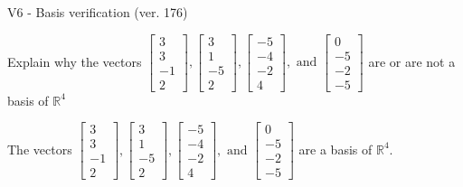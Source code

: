\begin{exercise}
  \begin{exerciseTitle}V6 - Basis verification (ver. 176)\end{exerciseTitle}
  \begin{exerciseStatement}
    Explain why the vectors \(\left[\begin{array}{r}
3 \\
3 \\
-1 \\
2
\end{array}\right] , \left[\begin{array}{r}
3 \\
1 \\
-5 \\
2
\end{array}\right] , \left[\begin{array}{r}
-5 \\
-4 \\
-2 \\
4
\end{array}\right] , \text{ and } \left[\begin{array}{r}
0 \\
-5 \\
-2 \\
-5
\end{array}\right]\) are or are not a basis of \(\mathbb{R}^4\)	


  \end{exerciseStatement}
  \begin{exerciseAnswer}
   The vectors \(\left[\begin{array}{r}
3 \\
3 \\
-1 \\
2
\end{array}\right] , \left[\begin{array}{r}
3 \\
1 \\
-5 \\
2
\end{array}\right] , \left[\begin{array}{r}
-5 \\
-4 \\
-2 \\
4
\end{array}\right] , \text{ and } \left[\begin{array}{r}
0 \\
-5 \\
-2 \\
-5
\end{array}\right]\) 
  	 are  a basis of \(\mathbb{R}^4\).
  


  \end{exerciseAnswer}
\end{exercise}